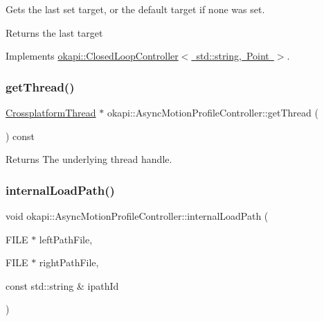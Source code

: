 Gets the last set target, or the default target if none was set.

\begin{DoxyReturn}{Returns}
the last target 
\end{DoxyReturn}


Implements \mbox{\hyperlink{classokapi_1_1ClosedLoopController_a22012bedbfaff6e5a3a508f274ec2497}{okapi\+::\+Closed\+Loop\+Controller$<$ std\+::string, Point $>$}}.

\mbox{\label{classokapi_1_1AsyncMotionProfileController_aaac5113b3567c28dc1c5ba0dcf7facdd}} 
\subsubsection{\texorpdfstring{getThread()}{getThread()}}
{\footnotesize\ttfamily \mbox{\hyperlink{classCrossplatformThread}{Crossplatform\+Thread}} $\ast$ okapi\+::\+Async\+Motion\+Profile\+Controller\+::get\+Thread (\begin{DoxyParamCaption}{ }\end{DoxyParamCaption}) const}

\begin{DoxyReturn}{Returns}
The underlying thread handle. 
\end{DoxyReturn}
\mbox{\label{classokapi_1_1AsyncMotionProfileController_adc93d9516b749dee19f0af735d4b83cb}} 
\subsubsection{\texorpdfstring{internalLoadPath()}{internalLoadPath()}}
{\footnotesize\ttfamily void okapi\+::\+Async\+Motion\+Profile\+Controller\+::internal\+Load\+Path (\begin{DoxyParamCaption}\item[{F\+I\+LE $\ast$}]{left\+Path\+File,  }\item[{F\+I\+LE $\ast$}]{right\+Path\+File,  }\item[{const std\+::string \&}]{ipath\+Id }\end{DoxyParamCaption})\hspace{0.3cm}{\ttfamily [protected]}}

